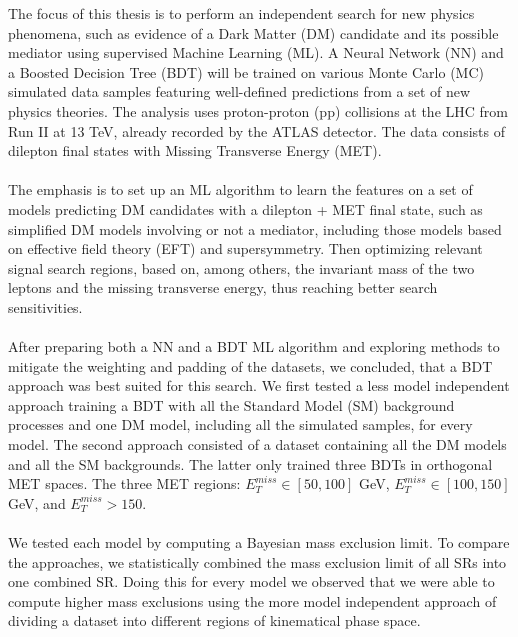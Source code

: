 \documentclass[12pt, a4paper]{book}
\begin{document}
The focus of this thesis is to perform an independent search for new physics phenomena, such as evidence of a Dark Matter (DM) candidate and its possible mediator using supervised Machine Learning (ML). A Neural Network (NN) and a Boosted Decision Tree (BDT) will 
be trained on various Monte Carlo (MC) simulated data samples featuring well-defined predictions from a set of new physics theories. The analysis uses proton-proton (pp) collisions at the LHC from Run II at 13 TeV, already recorded by the ATLAS detector. 
The data consists of dilepton final states with Missing Transverse Energy (MET).\\
\\The emphasis is to set up an ML algorithm to learn the features on a set of models predicting DM candidates with a dilepton + MET final state, such as simplified DM models 
involving or not a mediator, including those models based on effective field theory (EFT) and supersymmetry. Then optimizing relevant signal search regions, based on, among others, the invariant mass of the two leptons and the missing transverse energy, 
thus reaching better search sensitivities.\\
\\After preparing both a NN and a BDT ML algorithm and exploring methods to mitigate the weighting and padding of the datasets, we concluded, that a BDT approach was best suited for this search. We first tested a less model independent approach training a BDT with all the Standard Model (SM) background processes and one DM model, 
including all the simulated samples, for every model. The second approach consisted of a dataset containing all the DM models and all the SM backgrounds. The latter only trained three BDTs in orthogonal MET spaces. The three MET regions: $E_T^{miss}\in[50,100]$ GeV,
$E_T^{miss}\in[100,150]$ GeV, and $E_T^{miss}>150$.\\
\\We tested each model by computing a Bayesian mass exclusion limit. To compare the approaches, we statistically combined the mass exclusion limit of all SRs into one combined SR. Doing this for every model we observed that we were able 
to compute higher mass exclusions using the more model independent approach of dividing a dataset into different regions of kinematical phase space. 
\end{document}
